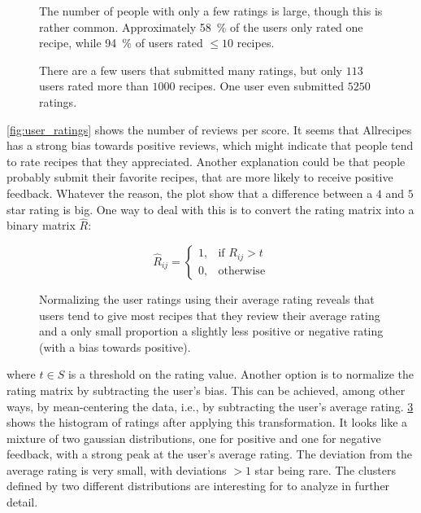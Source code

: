 \begin{figure}[htbp]
	\centering
	
	\caption{The number of people with only a few ratings is large, though this is rather common. Approximately \SI{58}{\percent} of the users only rated one recipe, while \SI{94}{\percent} of users rated $\leq 10$ recipes.}
	\label{fig:user_little_ratings}
\end{figure}

\begin{figure}[htbp]
	\centering
	
	\caption{There are a few users that submitted many ratings, but only $113$ users rated more than $1000$ recipes. One user even submitted $\num{5250}$ ratings.}
	\label{fig:user_many_ratings}
\end{figure}

\cref{fig:user_ratings} shows the number of reviews per score.
It seems that Allrecipes has a strong bias towards positive reviews, which might indicate that people tend to rate recipes that they appreciated.
Another explanation could be that people probably submit their favorite recipes, that are more likely to receive positive feedback.
Whatever the reason, the plot show that a difference between a $4$ and $5$ star rating is big.
One way to deal with this is to convert the rating matrix into a binary matrix $\hat{R}$:

\begin{equation*}
	\tag{Binary Rating matrix}
	\hat{R}_{ij}=
	\begin{cases}
	    1,& \text{if } R_{ij}>t \\
	    0,& \text{otherwise}
	\end{cases}
\end{equation*}

\begin{figure}[htbp]
	\centering
	
	\caption{Normalizing the user ratings using their average rating reveals that users tend to give most recipes that they review their average rating and a only small proportion a slightly less positive or negative rating (with a bias towards positive).}
	\label{fig:normalized_ratings}
\end{figure}

\noindent where $t \in S$ is a threshold on the rating value.
Another option is to normalize the rating matrix by subtracting the user's bias.
This can be achieved, among other ways, by mean-centering the data, i.e., by subtracting the user's average rating.
\cref{fig:normalized_ratings} shows the histogram of ratings after applying this transformation.
It looks like a mixture of two gaussian distributions, one for positive and one for negative feedback, with a strong peak at the user's average rating.
The deviation from the average rating is very small, with deviations $>1$ star being rare.
The clusters defined by two different distributions are interesting for to analyze in further detail.


